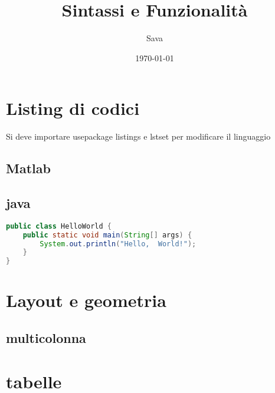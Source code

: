 \documentclass[12pt, a4paper]{article}
\title{Sintassi e Funzionalità}
\author{Sava}
\date{\today}
\begin{document}
	\maketitle
	\tableofcontents
	
	\newpage
	\section{Listing di codici}
	Si deve importare usepackage {listings}
	e lstset{} per modificare il linguaggio
	\subsection{Matlab}
	
	\subsection{java}
	\begin{lstlisting}[language=Java]
public class HelloWorld {
	public static void main(String[] args) {
		System.out.println("Hello,  World!");
	}
}
	\end{lstlisting}	
	
	\newpage
	\section{Layout e geometria}
	\subsection{multicolonna}
	\subsection{}
	
	\newpage
	\section{tabelle}
	\begin{tabbing}
		
	\end{tabbing}
	
\end{document}
